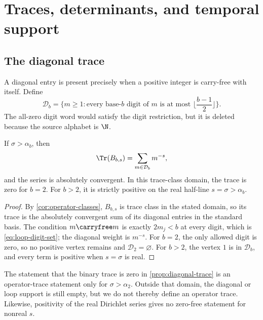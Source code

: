 \section{Traces, determinants, and temporal support}
\label{sec:dynamics}

\subsection{The diagonal trace}

A diagonal entry is present precisely when a positive integer is
carry-free with itself.  Define
\begin{equation}
  \mathcal D_b
  =
  \{
    m\ge1:
    \text{every base-\(b\) digit of \(m\) is at most }
    \lfloor\frac{b-1}{2}\rfloor
  \}.
  \label{eq:loop-digit-set}
\end{equation}
The all-zero digit word would satisfy the digit restriction, but it is
deleted because the source alphabet is \(\N\).

\begin{proposition}
\label{prop:diagonal-trace}
If \(\sigma>\alpha_b\), then
\begin{equation}
  \Tr(B_{b,s})
  =
  \sum_{m\in\mathcal D_b}m^{-s},
  \label{eq:trace-dirichlet}
\end{equation}
and the series is absolutely convergent.  In this trace-class domain, the
trace is zero for \(b=2\).  For \(b>2\), it is strictly positive on the
real half-line \(s=\sigma>\alpha_b\).
\end{proposition}

\begin{proof}
By \cref{cor:operator-classes}, \(B_{b,s}\) is trace class in the stated
domain, so its trace is the absolutely convergent sum of its diagonal
entries in the standard basis.  The condition \(m\carryfree m\) is exactly
\(2m_j<b\) at every digit, which is
\cref{eq:loop-digit-set}; the diagonal weight is \(m^{-s}\).
For \(b=2\), the only allowed digit is zero, so no positive vertex remains
and \(\mathcal D_2=\varnothing\).  For \(b>2\), the vertex \(1\) is in
\(\mathcal D_b\), and every term is positive when \(s=\sigma\) is real.
\end{proof}

The statement that the binary trace is zero in
\cref{prop:diagonal-trace} is an operator-trace statement only for
\(\sigma>\alpha_2\).  Outside that domain, the diagonal or loop support is
still empty, but we do not thereby define an operator trace.  Likewise,
positivity of the real Dirichlet series gives no zero-free statement for
nonreal \(s\).

